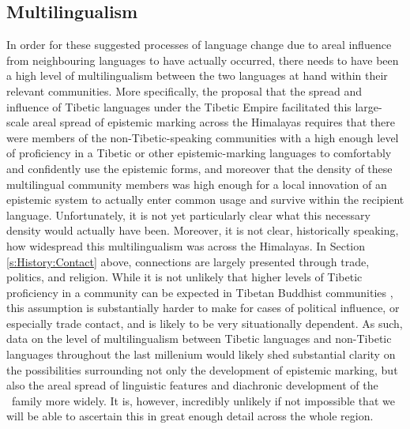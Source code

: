 \subsection{Multilingualism}
In order for these suggested processes of language change due to areal influence from neighbouring languages to have actually occurred, there needs to have been a high level of multilingualism between the two languages at hand within their relevant communities. More specifically, the proposal that the spread and influence of Tibetic languages under the Tibetic Empire facilitated this large-scale areal spread of epistemic marking across the Himalayas requires that there were members of the non-Tibetic-speaking communities with a high enough level of proficiency in a Tibetic or other epistemic-marking languages to comfortably and confidently use the epistemic forms, and moreover that the density of these multilingual community members was high enough for a local innovation of an epistemic system to actually enter common usage and survive within the recipient language. Unfortunately, it is not yet particularly clear what this necessary density would actually have been. Moreover, it is not clear, historically speaking, how widespread this multilingualism was across the Himalayas. In Section \ref{s:History:Contact} above, connections are largely presented through trade, politics, and religion. While it is not unlikely that higher levels of Tibetic proficiency in a community can be expected in Tibetan Buddhist communities , this assumption is substantially harder to make for cases of political influence, or especially trade contact, and is likely to be very situationally dependent. As such, data on the level of multilingualism between Tibetic languages and non-Tibetic languages throughout the last millenium would likely shed substantial clarity on the possibilities surrounding not only the development of epistemic marking, but also the areal spread of linguistic features and diachronic development of the \lfam\ family more widely. It is, however, incredibly unlikely if not impossible that we will be able to ascertain this in great enough detail across the whole region.
